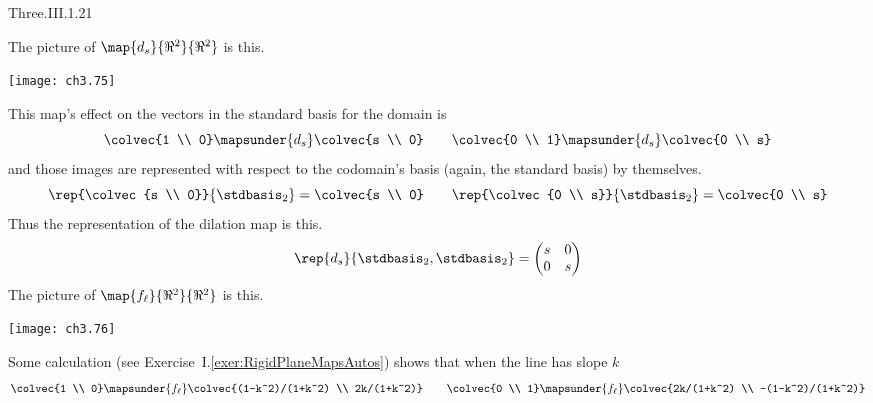 \begin{ans}{Three.III.1.21}
      \begin{exparts}
        \partsitem The picture of $\map{d_s}{\Re^2}{\Re^2}$ is this.
          \begin{center}  \small
            \texttt{[image: ch3.75]}
          \end{center}
         This map's effect on the vectors in the standard basis for the domain
         is
         \begin{equation*}
            \colvec{1 \\ 0}\mapsunder{d_s}\colvec{s \\ 0}
            \qquad
            \colvec{0 \\ 1}\mapsunder{d_s}\colvec{0 \\ s}
         \end{equation*}
         and those images are represented with respect to the
         codomain's basis (again, the standard basis) by themselves.
         \begin{equation*}
           \rep{\colvec{s \\ 0}}{\stdbasis_2}=\colvec{s \\ 0}
           \qquad
           \rep{\colvec{0 \\ s}}{\stdbasis_2}=\colvec{0 \\ s}
         \end{equation*}
         Thus the representation of the dilation map is this.
         \begin{equation*}
           \rep{d_s}{\stdbasis_2,\stdbasis_2}
           =\begin{pmatrix}
              s  &0  \\
              0  &s
           \end{pmatrix}
        \end{equation*}
      \partsitem The picture of $\map{f_\ell}{\Re^2}{\Re^2}$ is this.
         \begin{center}  \small
           \texttt{[image: ch3.76]}
        \end{center}
       Some calculation (see Exercise~I.\ref{exer:RigidPlaneMapsAutos})
       shows that when the line has slope $k$
       \begin{equation*}
         \colvec{1 \\ 0}
             \mapsunder{f_\ell}\colvec{(1-k^2)/(1+k^2) \\ 2k/(1+k^2)}
         \qquad
         \colvec{0 \\ 1}
             \mapsunder{f_\ell}\colvec{2k/(1+k^2) \\ -(1-k^2)/(1+k^2)}

\end{equation*}
\end{exparts}
\end{ans}
